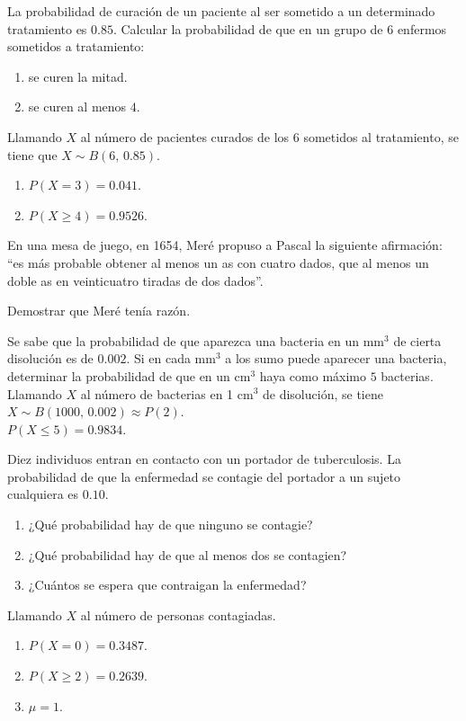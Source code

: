 {La probabilidad de curación de un paciente al ser sometido a un determinado tratamiento es $0.85$.
Calcular la probabilidad de que en un grupo de $6$ enfermos sometidos a tratamiento:
\begin{enumerate}
\item se curen la mitad.
\item se curen al menos $4$.
\end{enumerate}
}
{Llamando $X$ al número de pacientes curados de los 6 sometidos al tratamiento, se tiene que $X\sim B(6,\,0.85)$.
\begin{enumerate}
\item $P(X=3)=0.041$.
\item $P(X\geq 4)=0.9526$.
\end{enumerate}
}
{}


{En una mesa de juego, en 1654, Meré propuso a Pascal la siguiente afirmación: ``es más probable obtener al menos un as con cuatro dados, que al menos un doble as en veinticuatro tiradas de dos dados''.

Demostrar que Meré tenía razón.
}
{}
{}


{Se sabe que la probabilidad de que aparezca una bacteria en un mm$^3$ de cierta disolución es de $0.002$.
Si en cada mm$^3$ a los sumo puede aparecer una bacteria, determinar la probabilidad de que en un cm$^3$ haya como
máximo $5$ bacterias.}
{Llamando $X$ al número de bacterias en 1 cm$^3$ de disolución, se tiene $X\sim B(1000,\,0.002)\approx P(2)$.\\
$P(X\leq 5)=0.9834$.
}
{}


{Diez individuos entran en contacto con un portador de tuberculosis. La probabilidad de que la enfermedad se contagie del portador a un sujeto cualquiera es $0.10$.
\begin{enumerate}
\item ¿Qué probabilidad hay de que ninguno se contagie?
\item ¿Qué probabilidad hay de que al menos dos se contagien?
\item ¿Cuántos se espera que contraigan la enfermedad?
\end{enumerate}
}
{Llamando $X$ al número de personas contagiadas. 
\begin{enumerate}
\item $P(X=0)=0.3487$. 
\item $P(X\geq 2)=0.2639$.
\item $\mu=1$.
\end{enumerate}
}
{}


